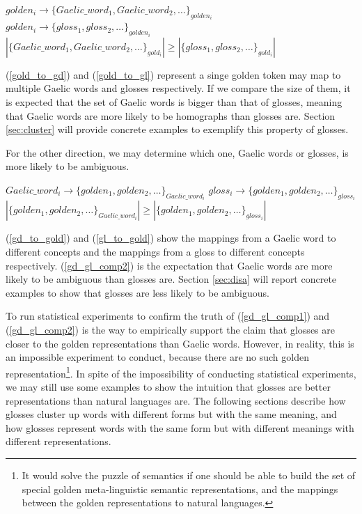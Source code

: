 \documentclass[final]{ua-thesis}
\numberwithin{equation}{section}
\begin{document}
\begin{exe}
\ex
	\begin{xlist}
	\ex \label{gold_to_gd} $golden_i \rightarrow \{Gaelic\_word_1, Gaelic\_word_2, \ldots\}_{golden_i}$
	\ex\label{gold_to_gl} $golden_i \rightarrow \{gloss_1, gloss_2, \ldots\}_{golden_i}$
	\ex\label{gd_gl_comp1}$ |\{Gaelic\_word_1, Gaelic\_word_2, \ldots\}_{gold_i}| \geq |\{gloss_1, gloss_2, \ldots\}_{gold_i}|$
	\end{xlist}
\end{exe}

(\ref{gold_to_gd}) and (\ref{gold_to_gl}) represent a singe golden token may map to multiple Gaelic words and glosses respectively. If we compare the size of them, it is expected that the set of Gaelic words is bigger than that of glosses, meaning that Gaelic words are more likely to be homographs than glosses are. Section \ref{sec:cluster} will provide concrete examples to exemplify this property of glosses. 

For the other direction, we may determine which one, Gaelic words or glosses, is more likely to be ambiguous.   

\begin{exe}
\ex
	\begin{xlist}
	\ex \label{gd_to_gold} $Gaelic\_word_i \rightarrow \{golden_1, golden_2, \ldots\}_{Gaelic\_word_i}$
	\ex \label{gl_to_gold} $gloss_i \rightarrow \{golden_1, golden_2, \ldots\}_{gloss_i}$
	\ex\label{gd_gl_comp2}$ |\{golden_1, golden_2, \ldots\}_{Gaelic\_word_i}| \geq |\{golden_1, golden_2, \ldots\}_{gloss_i}|$
	\end{xlist}
\end{exe}

(\ref{gd_to_gold}) and (\ref{gl_to_gold}) show the mappings from a Gaelic word to different concepts and the mappings from a gloss to different concepts respectively. 
(\ref{gd_gl_comp2}) is the expectation that Gaelic words are more likely to be ambiguous than glosses are. Section \ref{sec:disa} will report concrete examples to show that glosses are less likely to be ambiguous.

To run statistical experiments to confirm the truth of (\ref{gd_gl_comp1}) and (\ref{gd_gl_comp2}) is the way to empirically support the claim that glosses are closer to the golden representations than Gaelic words. 
However, in reality, this is an impossible experiment to conduct, because there are no such golden representation\footnote{It would solve the puzzle of semantics if one should be able to build the set of special golden meta-linguistic semantic representations, and the mappings between the golden representations to natural languages.}.
In spite of the impossibility of conducting statistical experiments, we may still use some examples to show the intuition that glosses are better representations than natural languages are. The following sections describe how glosses cluster up words with different forms but with the same meaning, and how glosses represent words with the same form but with different meanings with different representations. 
\end{document}
